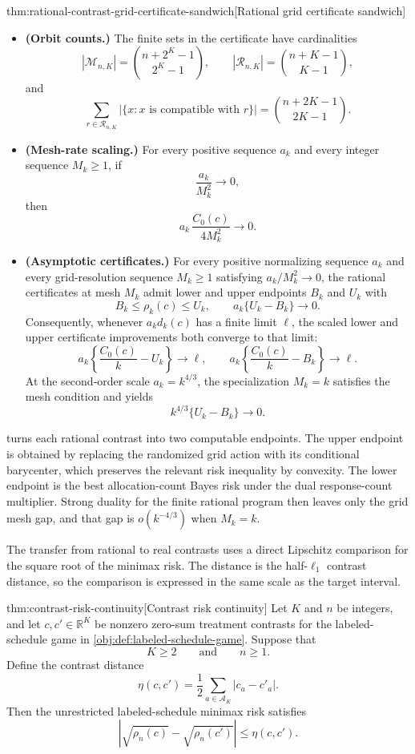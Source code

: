 \begin{theoremv}{thm:rational-contrast-grid-certificate-sandwich}[Rational grid certificate sandwich]
\begin{itemize}
\[\leq
B_{n,c}(\nu_{n,M,c})+\frac{C_0(c)}{4M^2}.
\]
\item \textbf{(Orbit counts.)}  The finite sets in the certificate have cardinalities
\[
|\mathcal M_{n,K}|=\binom{n+2^K-1}{2^K-1},
\qquad
|\mathcal R_{n,K}|=\binom{n+K-1}{K-1},
\]
and
\[
\sum_{r\in\mathcal R_{n,K}}|\{x:x\text{ is compatible with }r\}|
=
\binom{n+2K-1}{2K-1}.
\]
\item \textbf{(Mesh-rate scaling.)}  For every positive sequence \(a_k\) and every integer sequence \(M_k\geq1\), if
\[
\frac{a_k}{M_k^2}\longrightarrow 0,
\]
then
\[
a_k\,\frac{C_0(c)}{4M_k^2}\longrightarrow 0.
\]
\item \textbf{(Asymptotic certificates.)}  For every positive normalizing sequence \(a_k\) and every grid-resolution sequence \(M_k\geq1\) satisfying \(a_k/M_k^2\to0\), the rational certificates at mesh \(M_k\) admit lower and upper endpoints \(B_{k}\) and \(U_{k}\) with
\[
B_k\leq \rho_k(c)\leq U_k,
\qquad
a_k\{U_k-B_k\}\longrightarrow 0.
\]
Consequently, whenever \(a_k d_k(c)\) has a finite limit \(\ell\), the scaled lower and upper certificate improvements both converge to that limit:
\[
a_k\left\{\frac{C_0(c)}{k}-U_k\right\}\longrightarrow \ell,
\qquad
a_k\left\{\frac{C_0(c)}{k}-B_k\right\}\longrightarrow \ell.
\]
At the second-order scale \(a_k=k^{4/3}\), the specialization \(M_k=k\) satisfies the mesh condition and yields
\[
k^{4/3}\{U_k-B_k\}\longrightarrow 0.
\]
\end{itemize}
\end{theoremv}

 turns each rational contrast into two computable endpoints. The upper endpoint is obtained by replacing the randomized grid action with its conditional barycenter, which preserves the relevant risk inequality by convexity. The lower endpoint is the best allocation-count Bayes risk under the dual response-count multiplier. Strong duality for the finite rational program then leaves only the grid mesh gap, and that gap is \(o(k^{-4/3})\) when \(M_k=k\).

The transfer from rational to real contrasts uses a direct Lipschitz comparison for the square root of the minimax risk. The distance is the half-\(\ell_1\) contrast distance, so the comparison is expressed in the same scale as the target interval.

\begin{theoremv}{thm:contrast-risk-continuity}[Contrast risk continuity]
Let \(K\) and \(n\) be integers, and let \(c,c'\in\mathbb R^K\) be nonzero zero-sum treatment contrasts for the labeled-schedule game in \cref{obj:def:labeled-schedule-game}. Suppose that
\[
K\ge 2
\qquad\text{and}\qquad
n\ge 1 .
\]
Define the contrast distance
\[
\eta(c,c')
=
\frac12\sum_{a\in\mathcal A_K}|c_a-c'_a| .
\]
Then the unrestricted labeled-schedule minimax risk satisfies
\[
\left|\sqrt{\rho_n(c)}-\sqrt{\rho_n(c')}\right|
\le
\eta(c,c') .
\]
\end{theoremv}


